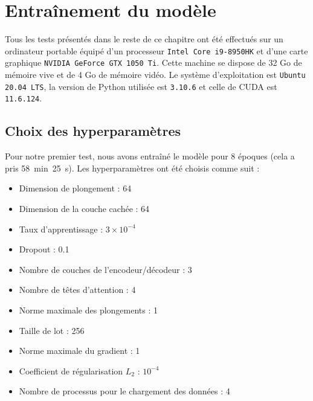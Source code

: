 \section{Entraînement du modèle}%
\label{sec.results.training}

Tous les tests présentés dans le reste de ce chapitre ont été effectués sur un ordinateur portable 
équipé d'un processeur \verb|Intel Core i9-8950HK| et d'une carte graphique \verb|NVIDIA GeForce GTX 1050 Ti|.
Cette machine se dispose de 32 Go de mémoire vive et de 4 Go de mémoire vidéo.
Le système d'exploitation est \verb|Ubuntu 20.04 LTS|, 
la version de Python utilisée est \verb|3.10.6|
et celle de CUDA est \verb|11.6.124|.


\subsection{Choix des hyperparamètres}%
\label{sub.results.training.hyperparameters}

Pour notre premier test, nous avons entraîné le modèle pour 8 époques (cela a pris 58~min~25~s).
Les hyperparamètres ont été choisis comme suit :
\begin{itemize}
    \item Dimension de plongement : 64
    \item Dimension de la couche cachée : 64
    \item Taux d'apprentissage : \(3 \times 10^{-4}\)
    \item Dropout : 0.1
    \item Nombre de couches de l'encodeur/décodeur : 3
    \item Nombre de têtes d'attention : 4
    \item Norme maximale des plongements : 1
    \item Taille de lot : 256
    \item Norme maximale du gradient : 1
    \item Coefficient de régularisation \(L_2\) : \(10^{-4}\)
    \item Nombre de processus pour le chargement des données : 4
\end{itemize}


